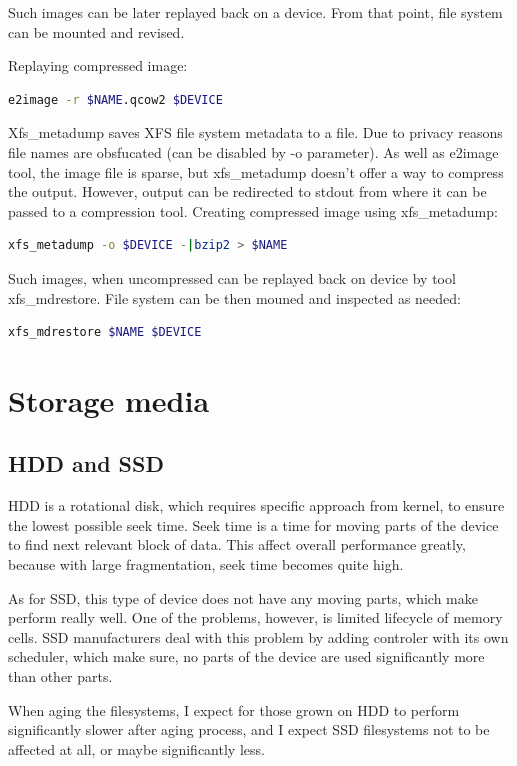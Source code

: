 \documentclass[
  color, %
  table, %
  lof,   %
  lot,   %
]{fithesis3}
\begin{document}
\noindent Such images can be later replayed back on a device. From that point, file system can be mounted and revised.

\noindent Replaying compressed image:
\begin{lstlisting}[language=bash]
  e2image -r $NAME.qcow2 $DEVICE
\end{lstlisting}

Xfs\_metadump saves XFS file system metadata to a file. Due to privacy reasons file names are obsfucated (can be disabled by -o parameter). As well as e2image tool, the image file is sparse, but xfs\_metadump doesn't offer a way to compress the output. However, output can be redirected to stdout from where it can be passed to a compression tool. Creating compressed image using xfs\_metadump:

\begin{lstlisting}[language=bash]
  xfs_metadump -o $DEVICE -|bzip2 > $NAME
\end{lstlisting}

Such images, when uncompressed can be replayed back on device by tool xfs\_mdrestore. File system can be then mouned and inspected as needed:

\begin{lstlisting}[language=bash]
  xfs_mdrestore $NAME $DEVICE
\end{lstlisting}

\chapter{Storage media}
\section{HDD and SSD}
HDD is a rotational disk, which requires specific approach from kernel, to ensure the lowest possible seek time. Seek time is a time for moving parts of the device to find next relevant block of data. This affect overall performance greatly, because with large fragmentation, seek time becomes quite high.

As for SSD, this type of device does not have any moving parts, which make perform really well. One of the problems, however, is limited lifecycle of memory cells. SSD manufacturers deal with this problem by adding controler with its own scheduler, which make sure, no parts of the device are used significantly more than other parts.

When aging the filesystems, I expect for those grown on HDD to perform significantly slower after aging process, and I expect SSD filesystems not to be affected at all, or maybe significantly less.
\end{document}
